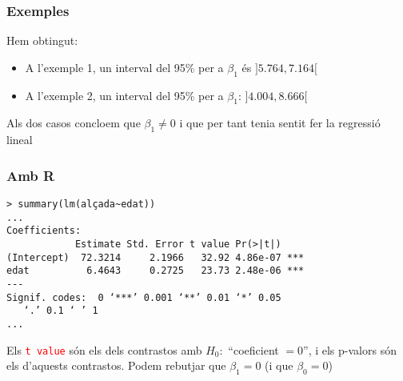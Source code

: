 \documentclass[12pt,t]{beamer}
\newcommand{\red}[1]{\textcolor{red}{#1}}
\theoremstyle{plain}
\theoremstyle{definition}
\begin{document}
\begin{frame}
\frametitle{Exemples}
\vspace*{-2ex}

Hem obtingut:
\begin{itemize}
\item A l'exemple 1, un interval del 95\% per a $\beta_1$ és $]5.764,7.164[$
\medskip

\item A l'exemple 2, un interval del 95\% per a $\beta_1$:  $]4.004,8.666[$
\end{itemize}
\medskip

Als dos casos concloem que $\beta_1\neq 0$ i que per tant tenia sentit fer la regressió lineal
\end{frame}

\begin{frame}[fragile]
\frametitle{Amb R}
{\footnotesize \begin{verbatim}
> summary(lm(alçada~edat))
...
Coefficients:
            Estimate Std. Error t value Pr(>|t|)    
(Intercept)  72.3214     2.1966   32.92 4.86e-07 ***
edat          6.4643     0.2725   23.73 2.48e-06 ***
---
Signif. codes:  0 ‘***’ 0.001 ‘**’ 0.01 ‘*’ 0.05
   ‘.’ 0.1 ‘ ’ 1 
...
\end{verbatim}
}

Els \red{\texttt{t value}} són els dels contrastos amb $H_0:$ ``coeficient $=0$'', i els p-valors són els d'aquests
 contrastos. Podem rebutjar que $\beta_1=0$ (i que $\beta_0=0$)

\end{frame}
\end{document}
